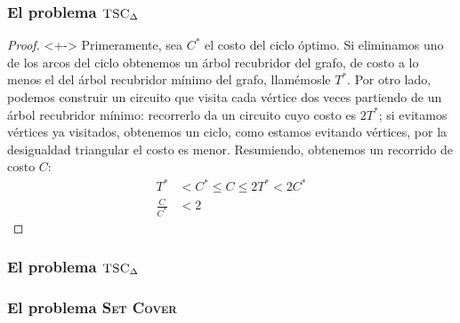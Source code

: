 \documentclass[english, spanish, fleqn,%
hyperref = {colorlinks, urlcolor = blue}%
]{beamer}
\begin{document}
\begin{frame}
  \setcounter{beamerpauses}{2}
  \frametitle{El problema \(\text{\textsc{TSC}}_\Delta\)}

  \begin{proof}<+->
    Primeramente,
    sea \(C^*\) el costo del ciclo óptimo.
    Si eliminamos uno de los arcos del ciclo
    obtenemos un árbol recubridor del grafo,
    de costo a lo menos el del árbol recubridor mínimo del grafo,
    llamémosle \(T^*\).
    Por otro lado,
    podemos construir un circuito que visita cada vértice dos veces
    partiendo de un árbol recubridor mínimo:
    recorrerlo  da un circuito
    cuyo costo es \(2 T^*\);
    si evitamos vértices ya visitados,
    obtenemos un ciclo,
    como estamos evitando vértices,
    por la desigualdad triangular el costo es menor.
    Resumiendo,
    obtenemos un recorrido de costo \(C\):
    \begin{align*}
      T^*
        &<   C^*
         \le C
         \le 2 T^*
         <   2 C^* \\
      \frac{C}{C^*}
        &< 2
    \end{align*}
    \qedhere
  \end{proof}
\end{frame}

\begin{frame}
  \setcounter{beamerpauses}{2}
  \frametitle{El problema \(\text{\textsc{TSC}}_\Delta\)}

\end{frame}

\begin{frame}
  \setcounter{beamerpauses}{2}
  \frametitle{El problema \textsc{Set Cover}}


\end{frame}
\end{document}
